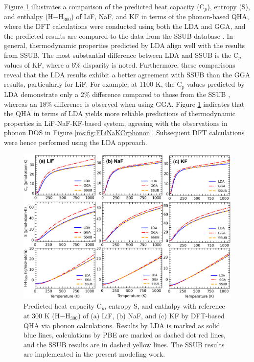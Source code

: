 Figure \ref{ms:fig:FLiNaKCr-Benchmark} illustrates a comparison of the predicted heat capacity (C$_p$), entropy (S), and enthalpy (H$-$H$_{300}$) of LiF, NaF, and KF in terms of the phonon-based QHA, where the DFT calculations were conducted using both the LDA and GGA, and the predicted results are compared to the data from the SSUB database \cite{sgteurl}. In general, thermodynamic properties predicted by LDA align well with the results from SSUB. The most substantial difference between LDA and SSUB is the C$_p$ values of KF, where a 6\% disparity is noted. Furthermore, these comparisons reveal that the LDA results exhibit a better agreement with SSUB than the GGA results, particularly for LiF. For example, at 1100 K, the C$_p$ values predicted by LDA demonstrate only a 2\% difference compared to those from the SSUB \cite{sgteurl}, whereas an 18\% difference is observed when using GGA. Figure \ref{ms:fig:FLiNaKCr-Benchmark} indicates that the QHA in terms of LDA yields more reliable predictions of thermodynamic properties in LiF-NaF-KF-based system, agreeing with the observations in phonon DOS in Figure \ref{ms:fig:FLiNaKCrphonon}. Subsequent DFT calculations were hence performed using the LDA approach. 

\begin{figure}[ht]
    \centering
    \includegraphics[width=1\linewidth]{moltensalts/Moltensalts-FLiNaKCr-Benchmark.jpg}
    \caption{Predicted heat capacity C$_p$, entropy S, and enthalpy with reference at 300 K (H$-$H$_{300}$) of (a) LiF, (b) NaF, and (c) KF by DFT-based QHA via phonon calculations. Results by LDA is marked as solid blue lines, calculations by PBE are marked as dashed dot red lines, and the SSUB results \cite{sgteurl} are in dashed yellow lines. The SSUB results are implemented in the present modeling work.}
    \label{ms:fig:FLiNaKCr-Benchmark}
\end{figure}

